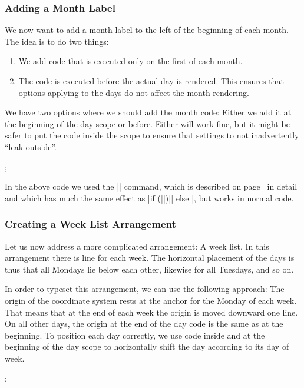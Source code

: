 \subsubsection{Adding a Month Label}

We now want to add a month label to the left of the beginning of each month.
The idea is to do two things:
%
\begin{enumerate}
    \item We add code that is executed only on the first of each month.
    \item The code is executed before the actual day is rendered. This ensures
        that options applying to the days do not affect the month rendering.
\end{enumerate}
%
We have two options where we should add the month code: Either we add it at the
beginning of the day scope or before. Either will work fine, but it might be
safer to put the code inside the scope to ensure that settings to not
inadvertently ``leak outside''.
%
\begin{codeexample}[]
\tikz
  \calendar
    [dates=2000-01-01 to 2000-01-08,
     execute after day scope={\pgftransformyshift{-1em}},
     execute at begin day scope=
       {\ifdate{day of month=1}{\tikzmonthcode}{}},
     every month/.append style={anchor=base east,xshift=-2em}];
\end{codeexample}

In the above code we used the |\ifdate| command, which is described on page~\pageref{ifdate} in
detail and which has much the same effect as
|if (||)|| else |, but works in
normal code.


\subsubsection{Creating a Week List Arrangement}

Let us now address a more complicated arrangement: A week list. In this
arrangement there is line for each week. The horizontal placement of the days
is thus that all Mondays lie below each other, likewise for all Tuesdays, and
so on.

In order to typeset this arrangement, we can use the following approach: The
origin of the coordinate system rests at the anchor for the Monday of each
week. That means that at the end of each week the origin is moved downward one
line. On all other days, the origin at the end of the day code is the same as
at the beginning. To position each day correctly, we use code inside and at the
beginning of the day scope to horizontally shift the day according to its day
of week.
%
\begin{codeexample}[]
\tikz
  \calendar
    [dates=2000-01-01 to 2000-01-20,
     execute at begin day scope=
       {\pgftransformxshift{\pgfcalendarcurrentweekday em}},
     execute after day scope=
       {\ifdate{Sunday}{\pgftransformyshift{-1em}}{}}];
\end{codeexample}


